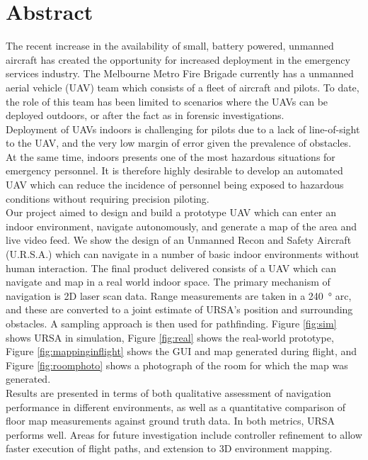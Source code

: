 \documentclass[capstone_report.tex]{subfiles}
\begin{document}
\chapter*{Abstract}                                
The recent increase in the availability of small, battery powered, unmanned aircraft has created the opportunity for increased deployment in the emergency services industry. The Melbourne Metro Fire Brigade currently has a unmanned aerial vehicle (UAV) team which consists of a fleet of aircraft and pilots. To date, the role of this team has been limited to scenarios where the UAVs can be deployed outdoors, or after the fact as in forensic investigations.\\

Deployment of UAVs indoors is challenging for pilots due to a lack of line-of-sight to the UAV, and the very low margin of error given the prevalence of obstacles. At the same time, indoors presents one of the most hazardous situations for emergency personnel. It is therefore highly desirable to develop an automated UAV which can reduce the incidence of personnel being exposed to hazardous conditions without requiring precision piloting.\\

Our project aimed to design and build a prototype UAV which can enter an indoor environment, navigate autonomously, and generate a map of the area and live video feed. We show the design of an Unmanned Recon and Safety Aircraft (U.R.S.A.) which can navigate in a number of basic indoor environments without human interaction. The final product delivered consists of a UAV which can navigate and map in a real world indoor space. The primary mechanism of navigation is 2D laser scan data. Range measurements are taken in a \SI{240}{\degree} arc, and these are converted to a joint estimate of URSA's position and surrounding obstacles. A sampling approach is then used for pathfinding. Figure \ref{fig:sim} shows URSA in simulation, Figure \ref{fig:real} shows the real-world prototype, Figure \ref{fig:mappinginflight} shows the GUI and map generated during flight, and Figure \ref{fig:roomphoto} shows a photograph of the room for which the map was generated.\\ 

Results are presented in terms of both qualitative assessment of navigation performance in different environments, as well as a quantitative comparison of floor map measurements against ground truth data. In both metrics, URSA performs well. Areas for future investigation include controller refinement to allow faster execution of flight paths, and extension to 3D environment mapping.
\end{document}
